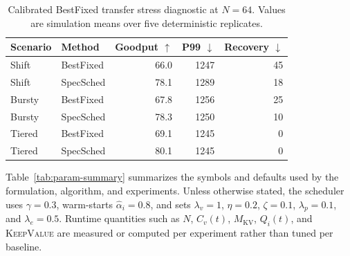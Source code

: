 \documentclass[10pt,journal,onecolumn]{IEEEtran}
\newcommand{\system}{SpecSched}
\begin{document}
\begin{table}[t]
\centering
\caption{Calibrated BestFixed transfer stress diagnostic at $N=64$.
Values are simulation means over five deterministic replicates.}
\label{tab:bestfixed-stress}
\scriptsize
\setlength{\tabcolsep}{3.0pt}
\renewcommand{\arraystretch}{1.12}
\begin{tabular}{@{}llrrr@{}}
\toprule
Scenario & Method & Goodput $\uparrow$ & P99 $\downarrow$ & Recovery $\downarrow$ \\
\midrule
Shift & BestFixed & 66.0 & 1247 & 45 \\
Shift & \system{} & 78.1 & 1289 & 18 \\
Bursty & BestFixed & 67.8 & 1256 & 25 \\
Bursty & \system{} & 78.3 & 1250 & 10 \\
Tiered & BestFixed & 69.1 & 1245 & 0 \\
Tiered & \system{} & 80.1 & 1245 & 0 \\
\bottomrule
\end{tabular}
\vspace{-0.5em}
\end{table}

Table~\ref{tab:param-summary} summarizes the symbols and defaults used
by the formulation, algorithm, and experiments. Unless otherwise
stated, the scheduler uses $\gamma=0.3$, warm-starts
$\hat{\alpha}_{i}=0.8$, and sets $\lambda_v=1$, $\eta=0.2$,
$\zeta=0.1$, $\lambda_p=0.1$, and $\lambda_e=0.5$. Runtime quantities
such as $N$, $C_v(t)$, $M_{\text{KV}}$, $Q_i(t)$, and
\textsc{KeepValue} are measured or computed per experiment rather than
tuned per baseline.
\end{document}
